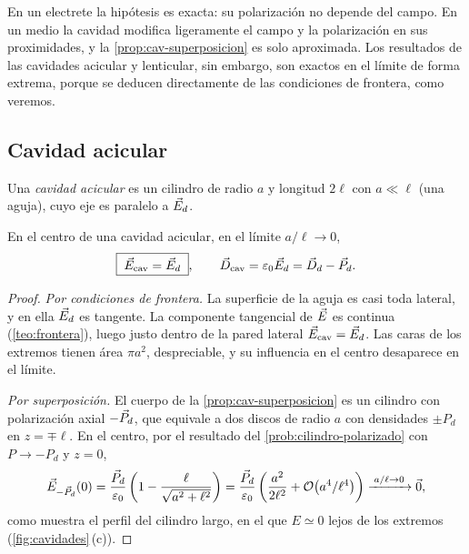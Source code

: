 \begin{observacion}\label{obs:cav-hipotesis}
En un electrete la hipótesis es exacta: su polarización no depende del campo. En un medio \LHI{} la cavidad modifica
ligeramente el campo y la polarización en sus proximidades, y la \cref{prop:cav-superposicion} es solo aproximada. Los
resultados de las cavidades acicular y lenticular, sin embargo, son exactos en el límite de forma extrema, porque se
deducen directamente de las condiciones de frontera, como veremos.
\end{observacion}



\subsection{Cavidad acicular}\label{sec:acicular}

\begin{definicion}\label{def:acicular}
Una \emph{cavidad acicular} es un cilindro de radio $a$ y longitud $2\ell$ con $a\ll\ell$ (una aguja), cuyo eje es paralelo a $\vec E_d$.
\end{definicion}

\begin{proposicion}\label{prop:acicular}
En el centro de una cavidad acicular, en el límite $a/\ell\to0$,
\begin{equation}\label{eq:acicular}
  \boxed{\;\vec E_{\mathrm{cav}}=\vec E_d\;},\qquad \vec D_{\mathrm{cav}}=\varepsilon_0\vec E_d=\vec D_d-\vec P_d .
\end{equation}
\end{proposicion}

\begin{proof}
\emph{Por condiciones de frontera.} La superficie de la aguja es casi toda lateral, y en ella $\vec E_d$ es tangente. La componente
tangencial de $\vec E$ es continua (\cref{teo:frontera}), luego justo dentro de la pared lateral $\vec E_{\mathrm{cav}}=\vec E_d$. Las caras de los
extremos tienen área $\pi a^2$, despreciable, y su influencia en el centro desaparece en el límite.

\emph{Por superposición.} El cuerpo de la \cref{prop:cav-superposicion} es un cilindro con polarización axial $-\vec P_d$, que equivale a dos
discos de radio $a$ con densidades $\pm P_d$ en $z=\mp\ell$. En el centro, por el resultado del \cref{prob:cilindro-polarizado} con
$P\to-P_d$ y $z=0$,
\[
  \vec E_{-\vec P_d}(0)=\frac{\vec P_d}{\varepsilon_0}\left(1-\frac{\ell}{\sqrt{a^2+\ell^2}}\right)=\frac{\vec P_d}{\varepsilon_0}\left(\frac{a^2}{2\ell^2}+\mathcal O\big(a^4/\ell^4\big)\right)
  \xrightarrow{\;a/\ell\to0\;}\vec 0 ,
\]
como muestra el perfil del cilindro largo, en el que $E\simeq0$ lejos de los extremos (\cref{fig:cavidades}\,(c)).
\end{proof}

